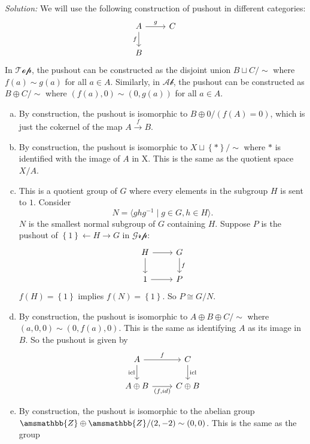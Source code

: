 \documentclass[a4paper, 12pt]{article}
\newenvironment{solution}
    {\textit{Solution:}}
    {}
\newcommand{\la}{\langle}
\newcommand{\ra}{\rangle}
\renewcommand{\mathbb}{\amsmathbb}
\begin{document}
\begin{solution}
We will use the following construction of pushout in different categories:
\[\begin{tikzcd}
	A & C \\
	B
	\arrow["g", from=1-1, to=1-2]
	\arrow["f"', from=1-1, to=2-1]
\end{tikzcd}\]
In \(\mathcal{Top}\), the pushout can be constructed as the disjoint union \(B\sqcup C/\sim\) where \(f(a)\sim g(a)\) for all \(a\in A\). Similarly, in \(\mathcal{Ab}\), the pushout can be constructed as 
\(B\oplus C/\sim\) where \((f(a),0)\sim (0,g(a))\) for all \(a\in A\).
\begin{enumerate}[(a)]
\item By construction, the pushout is isomorphic to \(B\oplus 0/(f(A)=0)\), which is just the cokernel of the map \(A\xrightarrow{f} B\). 
\item By construction, the pushout is isomorphic to \(X\sqcup \left\{ * \right\}/\sim\) where \(*\) is identified with the image of \(A\) in X. This is the same as the quotient space \(X/A\). 
\item This is a quotient group of \(G\) where every elements in the subgroup \(H\) is sent to \(1\). Consider 
\[N=\la ghg^{-1}\mid g\in G, h\in H\ra.\]
\(N\) is the smallest normal subgroup of \(G\) containing \(H\). Suppose \(P\) is the pushout of \(\left\{ 1 \right\}\leftarrow H\rightarrow G\) in \(\mathcal{Grp}\):
\[\begin{tikzcd}
	H & G \\
	1 & P
	\arrow[from=1-1, to=1-2]
	\arrow[from=1-1, to=2-1]
	\arrow["f", from=1-2, to=2-2]
	\arrow[from=2-1, to=2-2]
\end{tikzcd}\]
\(f(H)=\left\{ 1 \right\}\) implies \(f(N)=\left\{ 1 \right\}\). So \(P\cong G/N\). 
\item By construction, the pushout is isomorphic to \(A\oplus B\oplus C/\sim \) where \((a,0,0)\sim (0,f(a),0)\). This is the same as identifying \(A\) as its image in \(B\). So the pushout is given by 
\[\begin{tikzcd}
	A & C \\
	{A\oplus B} & {C\oplus B}
	\arrow["f", from=1-1, to=1-2]
	\arrow["{\text{icl}}"', from=1-1, to=2-1]
	\arrow["{\text{icl}}", from=1-2, to=2-2]
	\arrow["{(f,id)}"', from=2-1, to=2-2]
\end{tikzcd}\]
\item By construction, the pushout is isomorphic to the abelian group \(\mathbb{Z}\oplus \mathbb{Z}/(2,-2)\sim(0,0)\). This is the same as the group 

\end{enumerate}
\end{solution}
\end{document}
